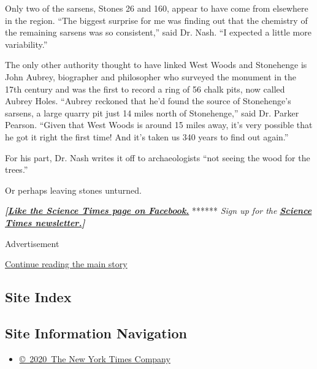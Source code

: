 Only two of the sarsens, Stones 26 and 160, appear to have come from
elsewhere in the region. ``The biggest surprise for me was finding out
that the chemistry of the remaining sarsens was so consistent,'' said
Dr. Nash. ``I expected a little more variability.''

The only other authority thought to have linked West Woods and
Stonehenge is John Aubrey, biographer and philosopher who surveyed the
monument in the 17th century and was the first to record a ring of 56
chalk pits, now called Aubrey Holes. ``Aubrey reckoned that he'd found
the source of Stonehenge's sarsens, a large quarry pit just 14 miles
north of Stonehenge,'' said Dr. Parker Pearson. ``Given that West Woods
is around 15 miles away, it's very possible that he got it right the
first time! And it's taken us 340 years to find out again.''

For his part, Dr. Nash writes it off to archaeologists ``not seeing the
wood for the trees.''

Or perhaps leaving stones unturned.

\textbf{\emph{{[}}\href{http://on.fb.me/1paTQ1h}{\emph{Like the Science
Times page on Facebook.}}} ****** \emph{\textbar{} Sign up for the}
\textbf{\href{http://nyti.ms/1MbHaRU}{\emph{Science Times
newsletter.}}\emph{{]}}}

Advertisement

\protect\hyperlink{after-bottom}{Continue reading the main story}

\hypertarget{site-index}{%
\subsection{Site Index}\label{site-index}}

\hypertarget{site-information-navigation}{%
\subsection{Site Information
Navigation}\label{site-information-navigation}}

\begin{itemize}
\tightlist
\item
  \href{https://help.nytimes3xbfgragh.onion/hc/en-us/articles/115014792127-Copyright-notice}{©~2020~The
  New York Times Company}
\end{itemize}

